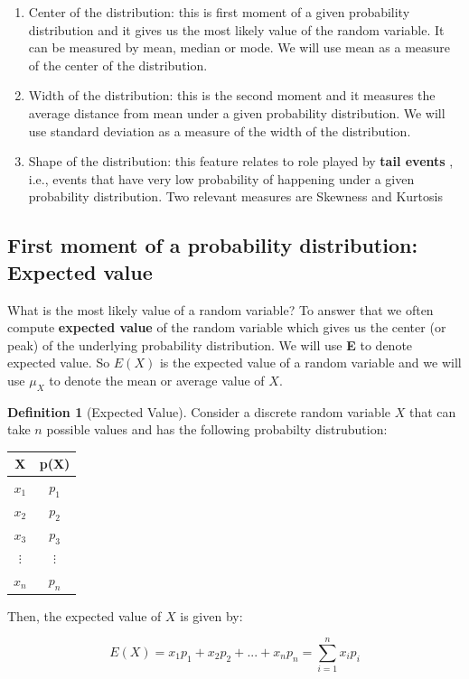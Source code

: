 \documentclass[
]{book}
\theoremstyle{definition}
\newtheorem{definition}{Definition}[chapter]
\theoremstyle{definition}
\theoremstyle{definition}
\theoremstyle{definition}
\theoremstyle{remark}
\begin{document}
\begin{enumerate}
\def\labelenumi{\arabic{enumi}.}
\item
  Center of the distribution: this is first moment of a given probability distribution and it gives us the most likely value of the random variable. It can be measured by mean, median or mode. We will use mean as a measure of the center of the distribution.
\item
  Width of the distribution: this is the second moment and it measures the average distance from mean under a given probability distribution. We will use standard deviation as a measure of the width of the distribution.
\item
  Shape of the distribution: this feature relates to role played by \textbf{tail events} , i.e., events that have very low probability of happening under a given probability distribution. Two relevant measures are Skewness and Kurtosis
\end{enumerate}

\hypertarget{first-moment-of-a-probability-distribution-expected-value}{%
\subsection{First moment of a probability distribution: Expected value}\label{first-moment-of-a-probability-distribution-expected-value}}

What is the most likely value of a random variable? To answer that we often compute \textbf{expected value} of the random variable which gives us the center (or peak) of the underlying probability distribution. We will use \textbf{E} to denote expected value. So \(E(X)\) is the expected value of a random variable and we will use \(\mu_X\) to denote the mean or average value of \(X\).

\begin{definition}[Expected Value]
\protect\hypertarget{def:unnamed-chunk-32}{}\label{def:unnamed-chunk-32}Consider a discrete random variable \(X\) that can take \(n\) possible values and has the following probabilty distrubution:

\begin{longtable}[]{@{}cc@{}}
\toprule()
X & p(X) \\
\midrule()
\endhead
\(x_1\) & \(p_1\) \\
\(x_2\) & \(p_2\) \\
\(x_3\) & \(p_3\) \\
\(\vdots\) & \(\vdots\) \\
\(x_n\) & \(p_n\) \\
\bottomrule()
\end{longtable}

Then, the expected value of \(X\) is given by:

\[E(X)= x_1 p_1 + x_2 p_2+...+ x_n p_n = \sum_{i=1}^n x_ip_i\]
\end{definition}
\end{document}
